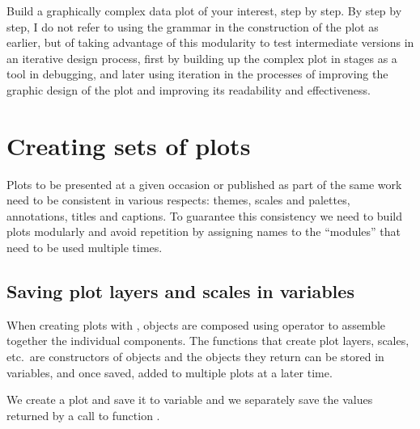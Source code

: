 \documentclass[krantz2]{krantz}\usepackage{knitr}
\begin{document}
\begin{playground}
  Build a graphically complex data plot of your interest, step by step. By step by step, I do not refer to using the grammar in the construction of the plot as earlier, but of taking advantage of this modularity to test intermediate versions in an iterative design process, first by building up the complex plot in stages as a tool in debugging, and later using iteration in the processes of improving the graphic design of the plot and improving its readability and effectiveness.
\end{playground}

\section{Creating sets of plots}\label{sec:plot:sets:of}
Plots to be presented at a given occasion or published as part of the same work need to be consistent in various respects: themes, scales and palettes, annotations, titles and captions. To guarantee this consistency we need to build plots modularly and avoid repetition by assigning names to the ``modules'' that need to be used multiple times.

\subsection{Saving plot layers and scales in variables}

When creating plots with \ggplot, objects are composed using operator \code{+} to assemble together the individual components. The functions that create plot layers, scales, etc.\ are constructors of objects and the objects they return can be stored in variables, and once saved, added to multiple plots at a later time.

We create a plot and save it to variable  and we separately save the values returned by a call to function .

\begin{knitrout}\footnotesize
{}\color{fgcolor}\begin{kframe}
\begin{alltt}
 \hlkwb{<-} \hlstd{(} 
                 \hlstd{(}   
                  \hlstd{=}  \hlopt{+}
          \hlstd{()}

 \hlkwb{<-} \hlstd{(} \hlstd{=} \hlstd{,}
                \hlstd{=} \hlstd{,}
                \hlstd{=} \hlstd{,}
                \hlstd{=} \hlstd{)}
\end{alltt}
\end{kframe}
\end{knitrout}
\end{document}
